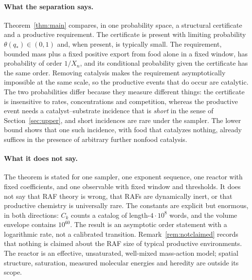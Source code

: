 \documentclass[11pt,letterpaper]{article}
\theoremstyle{plain}
\theoremstyle{definition}
\theoremstyle{remark}
\numberwithin{equation}{section}
\newcommand{\thetaq}{\theta(q_*)}
\begin{document}
\paragraph{What the separation says.}
Theorem~\ref{thm:main} compares, in one probability space, a structural certificate and a productive requirement. The certificate is present with limiting probability $\thetaq\in(0,1)$ and, when present, is typically small. The requirement, bounded mass plus a fixed positive export from food alone in a fixed window, has probability of order $1/X_n$, and its conditional probability given the certificate has the same order. Removing catalysis makes the requirement asymptotically impossible at the same scale, so the productive events that do occur are catalytic. The two probabilities differ because they measure different things: the certificate is insensitive to rates, concentrations and competition, whereas the productive event needs a catalyst--substrate incidence that is \emph{short} in the sense of Section~\ref{sec:upper}, and short incidences are rare under the sampler. The lower bound shows that one such incidence, with food that catalyzes nothing, already suffices in the presence of arbitrary further nonfood catalysis.

\paragraph{What it does not say.}
The theorem is stated for one sampler, one exponent sequence, one reactor with fixed coefficients, and one observable with fixed window and thresholds. It does not say that RAF theory is wrong, that RAFs are dynamically inert, or that productive chemistry is universally rare. The constants are explicit but enormous, in both directions: $C_k$ counts a catalog of length-$4\cdot10^8$ words, and the volume envelope contains $10^{60}$. The result is an asymptotic order statement with a logarithmic rate, not a calibrated transition. Remark~\ref{rem:notclaimed} records that nothing is claimed about the RAF size of typical productive environments. The reactor is an effective, unsaturated, well-mixed mass-action model; spatial structure, saturation, measured molecular energies and heredity are outside its scope.
\end{document}
